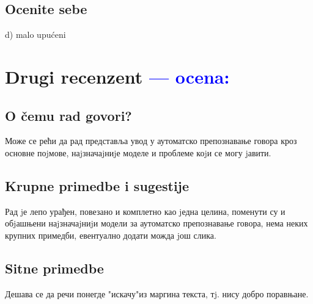 \documentclass[a4paper]{report}
\newcommand{\odgovor}[1]{\textcolor{blue}{#1}}
\begin{document}
\section{Ocenite sebe}
 d) malo upućeni 



\chapter{Drugi recenzent \odgovor{--- ocena:} }
\section{O čemu rad govori?}
Може се рећи да рад представља увод у аутоматско препознавање говора кроз основне поjмове, наjзначаjниjе моделе и проблеме коjи се могу jавити.

\section{Krupne primedbe i sugestije}
Рад jе лепо урађен, повезано и комплетно као jедна целина, поменути су и обjашњени наjзначаjниjи модели за аутоматско препознавање говора, нема неких крупних примедби, евентуално додати можда jош слика.

\section{Sitne primedbe}
Дешава се да речи понегде "искачу"из маргина текста, тj. нису добро поравњане.
\end{document}
